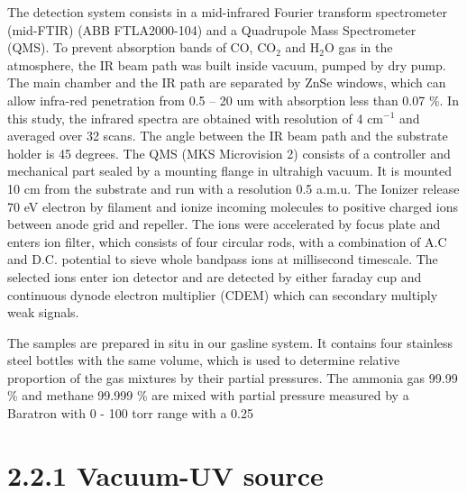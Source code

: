 The detection system consists in a mid-infrared Fourier transform spectrometer (mid-FTIR) (ABB FTLA2000-104) and a Quadrupole Mass Spectrometer (QMS). To prevent absorption bands of CO, CO$_2$ and H$_2$O gas in the atmosphere, the IR beam path was built inside vacuum, pumped by dry pump. The main chamber and the IR path are separated by ZnSe windows, which can allow infra-red penetration from 0.5 – 20 um with absorption less than 0.07 \%. In this study, the infrared spectra are obtained with resolution of 4 cm$^{-1}$ and averaged over 32 scans. The angle between the IR beam path and the substrate holder is 45 degrees. The QMS (MKS Microvision 2) consists of a controller and mechanical part sealed by a mounting flange in ultrahigh vacuum. It is mounted 10 cm from the substrate and run with a resolution 0.5 a.m.u. The Ionizer release 70 eV electron by filament and ionize incoming molecules to positive charged ions between anode grid and repeller. The ions were accelerated by focus plate and enters ion filter, which consists of four circular rods, with a combination of A.C and D.C. potential to sieve whole bandpass ions at millisecond timescale. The selected ions enter ion detector and are detected by either faraday cup and continuous dynode electron multiplier (CDEM) which can secondary multiply weak signals.

The samples are prepared in situ in our gasline system. It contains four stainless steel bottles with the same volume, which is used to determine relative proportion of the gas mixtures by their partial pressures. The ammonia gas 99.99 \% and methane 99.999 \% are mixed with partial pressure measured by a Baratron with 0 - 100 torr range with a 0.25%

\section{2.2.1 Vacuum-UV source}

